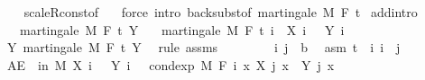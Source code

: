 \begin{isabellebody}
%
\isadelimproof
\ \ %
\endisadelimproof
%
\isatagproof
{}\isamarkupfalse%
\ scaleR{\isacharunderscore}{\kern0pt}const{\isacharbrackleft}{\kern0pt}of\ {\isachardoublequoteopen}{\isacharminus}{\kern0pt}{}{\isachardoublequoteclose}{\isacharbrackright}{\kern0pt}\ \isamarkupfalse%
\ {\isacharparenleft}{\kern0pt}force\ intro{\isacharcolon}{\kern0pt}\ back{\isacharunderscore}{\kern0pt}subst{\isacharbrackleft}{\kern0pt}of\ {\isachardoublequoteopen}martingale\ M\ F\ t%
\endisatagproof
{\isafoldproof}%
%
\isadelimproof
\isanewline
%
\endisadelimproof
\isanewline
{}\isamarkupfalse%
\ add{\isacharbrackleft}{\kern0pt}intro{\isacharbrackright}{\kern0pt}{\isacharcolon}{\kern0pt}\isanewline
\ \ \ {\isachardoublequoteopen}martingale\ M\ F\ t\ Y{\isachardoublequoteclose}\isanewline
\ \ \ {\isachardoublequoteopen}martingale\ M\ F\ t\ {\isacharparenleft}{\kern0pt}{\isasymlambda}i\ {\isasymxi}{\isachardot}{\kern0pt}\ X\ i\ {\isasymxi}\ {\isacharplus}{\kern0pt}\ Y\ i\ {\isasymxi}{\isacharparenright}{\kern0pt}{\isachardoublequoteclose}\isanewline
%
\isadelimproof
%
\endisadelimproof
%
\isatagproof
{}\isamarkupfalse%
\ {\isacharminus}{\kern0pt}\isanewline
\ \ \isamarkupfalse%
\ Y{\isacharcolon}{\kern0pt}\ martingale\ M\ F\ t\ Y\ \isamarkupfalse%
\ {\isacharparenleft}{\kern0pt}rule\ assms{\isacharparenright}{\kern0pt}\isanewline
\ \ \isacommand{{\isacharbraceleft}{\kern0pt}}\isamarkupfalse%
\isanewline
\ \ \ \ \isamarkupfalse%
\ i\ j\ {\isacharcolon}{\kern0pt}{\isacharcolon}{\kern0pt}\ {\isacharprime}{\kern0pt}b\ \isamarkupfalse%
\ asm{\isacharcolon}{\kern0pt}\ {\isachardoublequoteopen}t\ {\isasymle}\ i{\isachardoublequoteclose}\ {\isachardoublequoteopen}i\ {\isasymle}\ j{\isachardoublequoteclose}\isanewline
\ \ \ \ \isamarkupfalse%
\ {\isachardoublequoteopen}AE\ {\isasymxi}\ in\ M{\isachardot}{\kern0pt}\ X\ i\ {\isasymxi}\ {\isacharplus}{\kern0pt}\ Y\ i\ {\isasymxi}\ {\isacharequal}{\kern0pt}\ cond{\isacharunderscore}{\kern0pt}exp\ M\ {\isacharparenleft}{\kern0pt}F\ i{\isacharparenright}{\kern0pt}\ {\isacharparenleft}{\kern0pt}{\isasymlambda}x{\isachardot}{\kern0pt}\ X\ j\ x\ {\isacharplus}{\kern0pt}\ Y\ j\ x{\isacharparenright}{\kern0pt}\ {\isasymxi}{\isachardoublequoteclose}\ \isanewline

\end{isabellebody}

